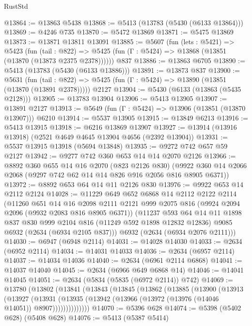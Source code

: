 \begin{lexlean}{RustStd}
\begin{coremodule}
@13864 := @13863 @5438
@13868 := @5413 (@13783 (@5430 (@6133 @13864)))
@13869 := @4246 @735
@13870 := @5472 @13869
@13871 := @5475 @13869
@13873 := @13871 @13811 @13091
@13885 := @5607
    (fun (lets : @5421) =>
    @5423
      (fun (tail : @822) =>
      @5425 (fun (Γ : @5424) => @13868 (@13851 (@13870 (@13873 @2375 @2378))))))
    @837
@13886 := @13863 @6705
@13890 := @5413 (@13783 (@5430 (@6133 @13886)))
@13891 := @13873 @837
@13900 := @5631
    (fun (tail : @822) => @5425 (fun (Γ : @5424) => @13890 (@13851 (@13870 (@13891 @2378)))))
    @2127
@13904 := @5430 (@6133 (@13863 (@5435 @2128)))
@13905 := @13783 @13904
@13906 := @5413 @13905
@13907 := @13891 @2127
@13913 := @5649 (fun (Γ : @5424) => @13906 (@13851 (@13870 @13907))) @6210
@13914 := @5537 @13905
@13915 := @13849 @6213
@13916 := @5413 @13915
@13918 := @6216 @13869 @13907
@13927 := @13914 (@13916 @13918) (@2521 @4649 @4645 @13904 @4656 (@2392 @13904))
@13931 := @5537 @13915 @13918 (@5694 @13848)
@13935 := @9272 @742 @657 @59 @2127
@13942 := @9277 @742 @360 @653 @14 @14 @2070 @2126
@13966 := @8892
    @360
    @655
    @14
    @16
    @2070
    (@823 @2126 @830)
    (@9922 @360 @14 @2066 @2068 (@9297 @742 @62 @14 @14 @826 @916 @2056 @816 @8905 @6371))
@13972 := @8892 @653 @64 @14 @11 @2126 @830
@13976 := @9922 @653 @14 @2112 @2124
@14028 := @11229
    @649
    @652
    @6868
    @14
    @2112
    @2122
    @2114
    (@11260
      @651
      @14
      @16
      @2098
      @2111
      @2121
      @999
      @2075
      @816
      (@9924 @2094 @2096 (@9932 @2083 @816 @8905 @6371))
      (@11237
        @593
        @64
        @14
        @11
        @1898
        @837
        @830
        @999
        @2104
        @816
        (@11249 @592 @1898 @12832 @12836)
        @9085
        @6932
        (@2634 (@6934 @2105 @837)))
      @6932
      (@2634 (@6934 @2076 @2111)))
@14030 := @6947 (@6948 @2114)
@14031 := @14028 @14030
@14033 := @2634 (@6952 @2114)
@14034 := @14031 @14033
@14036 := @2634 (@6957 @2114)
@14037 := @14034 @14036
@14040 := @2634 (@6961 @2114 @6868)
@14041 := @14037 @14040
@14045 := @2634 (@6966 @649 @6868 @14)
@14046 := @14041 @14045
@14051 := @2634 (@5834 (@5835 (@6972 @2114)) @742)
@14069 := @13780
    (@13802
      (@13841
        (@13843
          (@13845
            (@13862
              (@13885
                (@13900
                  (@13913
                    (@13927
                      (@13931
                        (@13935 (@13942 (@13966 (@13972 (@13976 (@14046 @14051)) @8907))))))))))))))
@14070 := @5396 @628
@14074 := @5398 (@5402 @628) (@5408 @628)
@14076 := @5413 (@5387 @5414)

\end{coremodule}
\end{lexlean}
